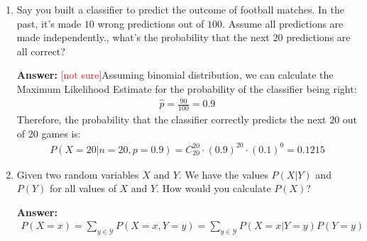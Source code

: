 \documentclass{article}
\newenvironment{QandA}{\begin{enumerate}[label=\arabic*.]}{\end{enumerate}}
\newenvironment{answer}{\par\normalfont \textbf{Answer:}}{}
\newcommand{\g}{\vert}
\newcommand{\notsure}{\textcolor{red}{[not sure]}}
\begin{document}
\begin{QandA}
    \item Say you built a classifier to predict the outcome of football matches. In the past, it's made $10$ wrong predictions out of $100$. Assume all predictions are made independently., what's the probability that the next $20$ predictions are all correct?
    \begin{answer}
        \notsure Assuming binomial distribution, we can calculate the Maximum Likelihood Estimate for the probability of the classifier being right:
        \begin{align*}
            \hat{p} = \frac{90}{100} = 0.9 
        \end{align*}
        Therefore, the probability that the classifier correctly predicts the next 20 out of 20 games is:
        \begin{align*}
            P(X=20 \g n=20, p=0.9) = C_{20}^{20} \cdot (0.9)^{20} \cdot (0.1)^{0} = 0.1215
        \end{align*}
    \end{answer}
    
    \item Given two random variables $X$ and $Y$. We have the values $P(X \g Y)$ and $P(Y)$ for all values of $X$ and $Y$. How would you calculate $P(X)$?
    \begin{answer}
        \begin{align*}
            P(X=x) = \sum_{y \in \mathcal{Y}} P(X=x, Y=y) = \sum_{y \in \mathcal{Y}} P(X=x \g Y=y) P(Y=y)
        \end{align*}
    \end{answer}


\end{QandA}
\end{document}
